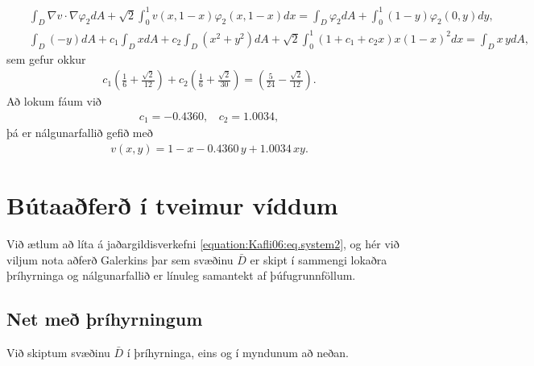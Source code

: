\documentclass[a4paper,10pt,icelandic]{sphinxmanual}
\begin{document}
\begin{equation*}
\begin{split}&&\int_D \nabla v \cdot \nabla \varphi_2 dA + \sqrt 2 \int_0^1 v(x,1-x) \varphi_2(x,1-x)dx= \int_D \varphi_2 dA+ \int_0^1 (1-y)\varphi_2(0,y)dy,
\\
&& \int_D (-y)dA+c_1 \int_D x dA+ c_2 \int_D (x^2+y^2) dA +\sqrt 2 \int_0^1 \left(1+c_1+c_2 x\right)x(1-x)^2dx =\int_D x\, y dA,\end{split}
\end{equation*}
sem gefur okkur
\begin{equation*}
\begin{split}c_1(\tfrac 16 +\tfrac{\sqrt 2}{12})+c_2(\tfrac 16 +\tfrac{\sqrt 2}{30})=(\tfrac{5}{24} -\tfrac{\sqrt 2}{12}).\end{split}
\end{equation*}
Að lokum fáum við
\begin{equation*}
\begin{split}c_1=-0.4360,  ~~~~c_2=1.0034,\end{split}
\end{equation*}
þá er nálgunarfallið gefið með
\begin{equation*}
\begin{split}v(x,y)=1-x-0.4360\, y+1.0034\, xy.\end{split}
\end{equation*}

\section{Bútaaðferð í tveimur víddum}
\label{\detokenize{Kafli06:butaafer-i-tveimur-viddum}}
Við ætlum að líta á jaðargildisverkefni \eqref{equation:Kafli06:eq.system2}, og hér við viljum nota aðferð Galerkins þar sem svæðinu \(\bar D\) er skipt í sammengi lokaðra þríhyrninga og nálgunarfallið er línuleg samantekt af þúfugrunnföllum.


\subsection{Net með þríhyrningum}
\label{\detokenize{Kafli06:net-me-rihyrningum}}\label{\detokenize{Kafli06:ch-6-5-1}}
Við skiptum svæðinu \(\bar D\)  í þríhyrninga, eins og í myndunum að neðan.

\end{document}
